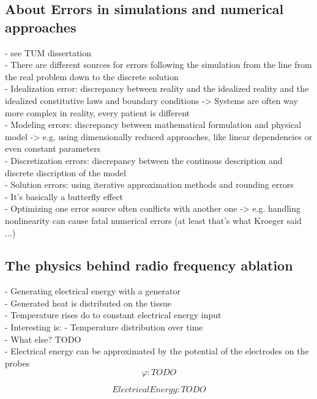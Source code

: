 \documentclass[parskip=half, titlepage=yes, 12pt, BCOR=12mm, DIV=calc]{scrartcl}
\begin{document}
\subsection{About Errors in simulations and numerical approaches}
- see TUM dissertation \\
- There are different sources for errors following the simulation from the line from the real problem down to the discrete solution \\
- Idealization error: discrepancy between reality and the idealized reality and the idealized constitutive laws and boundary conditions -> Systems are often way more complex in reality, every patient is different \\
- Modeling errors: discrepancy between mathematical formulation and physical model -> e.g. using dimensionally reduced approaches, like linear dependencies or even constant parameters  \\
-  Discretization errors: discrepancy between the continous description and discrete discription of the model \\
- Solution errors: using iterative approximation methods and rounding errors \\
- It's basically a butterfly effect \\
- Optimizing one error source often conflicts with another one -> e.g. handling nonlinearity can cause fatal numerical errors (at least that's what Kroeger said ...)


\subsection{The physics behind radio frequency ablation}
- Generating electrical energy with a generator \\
- Generated heat is distributed on the tissue \\
- Temperature rises do to constant electrical energy input \\
- Interesting is: - Temperature distribution over time \\
- What else? TODO \\
- Electrical energy can be approximated by the potential of the electrodes on the probes \\

\begin{equation}
    \varphi: TODO 
\end{equation}

\begin{equation}
    Electrical Energy: TODO
\end{equation}
\end{document}
